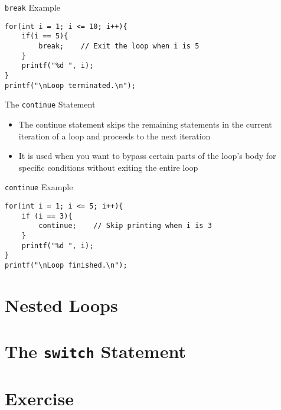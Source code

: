 \documentclass[12pt, aspectratio=169]{beamer}
\begin{document}
    \begin{frame}[fragile]{\texttt{break} Example}
        \begin{verbatim}
for(int i = 1; i <= 10; i++){
    if(i == 5){
        break;    // Exit the loop when i is 5
    }
    printf("%d ", i);
}
printf("\nLoop terminated.\n");
        \end{verbatim}
    \end{frame}


    \begin{frame}{The \texttt{continue} Statement}
        \begin{itemize}
            \item The continue statement skips the remaining statements in the current iteration of a loop and proceeds to the next iteration
            \item It is used when you want to bypass certain parts of the loop's body for specific conditions without exiting the entire loop
        \end{itemize}
    \end{frame}


    \begin{frame}[fragile]{\texttt{continue} Example}
        \begin{verbatim}
for(int i = 1; i <= 5; i++){
    if (i == 3){
        continue;    // Skip printing when i is 3
    }
    printf("%d ", i);
}
printf("\nLoop finished.\n");
        \end{verbatim}
    \end{frame}


    \section{Nested Loops}


    \section{The \texttt{switch} Statement}


    \section{Exercise}
\end{document}
